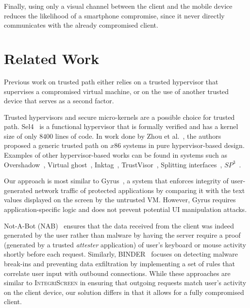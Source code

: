 \documentclass[sigconf, anonymous, balance=false]{acmart}
\newcommand{\myparagraph}[1]{\myparagraphnodot{#1.}}
\newcommand{\myparagraphnodot}[1]{\vspace{4pt} \noindent {\bfseries #1}\xspace}
\newcommand{\sysname}{\textsc{IntegriScreen}\xspace}
\begin{document}
Finally, using only a visual channel between the client and the mobile device reduces the likelihood of a smartphone compromise, since it never directly communicates with the already compromised client.

\section{Related Work} \label{sec:relatedWork}

Previous work on trusted path either relies on a trusted hypervisor that supervises a compromised virtual machine, or on the use of another trusted device that serves as a second factor.

\myparagraph{Trusted hypervisors}
Trusted hypervisors and secure micro-kernels are a possible choice for trusted path. Sel4~\cite{klein2009sel4} is a functional hypervisor that is formally verified and has a kernel size of only $8400$ lines of code. In work done by Zhou et al.~\cite{x86}, the authors proposed a generic trusted path on $x86$ systems in pure hypervisor-based design. Examples of other hypervisor-based works can be found in systems such as Overshadow~\cite{Overshadow}, Virtual ghost~\cite{criswell2014virtual}, Inktag~\cite{hofmann2013inktag}, TrustVisor~\cite{mccune2010trustvisor}, Splitting interfaces~\cite{ta2006splitting}, $SP^3$~\cite{yang2008using}.

Our approach is most similar to Gyrus~\cite{gyrus}, a system that enforces integrity of user-generated network traffic of protected applications by comparing it with the text values displayed on the screen by the untrusted VM.
However, Gyrus requires application-specific logic and does not prevent potential UI manipulation attacks.

Not-A-Bot (NAB)~\cite{nab} ensures that the data received from the client was indeed generated by the user rather than malware by having the server require a proof (generated by a trusted \emph{attester} application) of user's keyboard or mouse activity shortly before each request.
Similarly, BINDER~\cite{binder} focuses on detecting malware break-ins and preventing data exfiltration by implementing a set of rules that correlate user input with outbound connections.
While these approaches are similar to \sysname in ensuring that outgoing requests match user's activity on the client device, our solution differs in that it allows for a fully compromised client.
\end{document}
